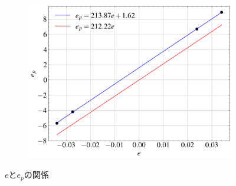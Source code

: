 \begin{figure}
\begin{subfigure}{0.45\linewidth}
		\includegraphics[width=\linewidth]{src/figures/e-e_p-relation/e-e_p-relation-100.png}
		\label{fig:e-e_p-relation-100}
	\end{subfigure}

	\caption{$e$と$e_p$の関係}\label{fig:e-e_p-relation}
\end{figure}
